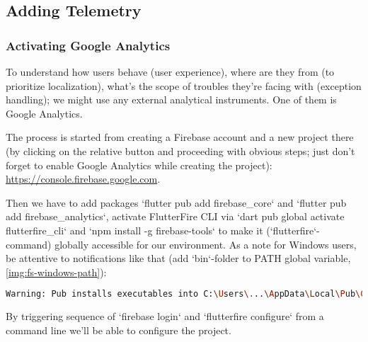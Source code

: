 
\subsection{Adding Telemetry}

\subsubsection{Activating Google Analytics}

To understand how users behave (user experience), where are they from (to prioritize localization), what's the scope of
troubles they're facing with (exception handling); we might use any external analytical instruments. One of them is 
Google Analytics.

The process is started from creating a Firebase account and a new project there (by clicking on the relative 
button and proceeding with obvious steps; just don't forget to enable Google Analytics while creating the project): 
\href{https://console.firebase.google.com}{https://console.firebase.google.com}.

Then we have to add packages `flutter pub add firebase\_core` and `flutter pub add firebase\_analytics`, activate 
FlutterFire CLI  via `dart pub global activate flutterfire\_cli` and `npm install -g firebase-tools` to make it 
(`flutterfire`-command) globally accessible for our environment. As a note for Windows users, be attentive to 
notifications like that (add `bin`-folder to PATH global variable, \cref{img:fs-windows-path}):

\begin{lstlisting}[language=bash]
Warning: Pub installs executables into C:\Users\...\AppData\Local\Pub\Cache\bin, which is not on your path.
\end{lstlisting}

\noindent By triggering sequence of `firebase login` and `flutterfire configure` from a command line 
we'll be able to configure the project.

